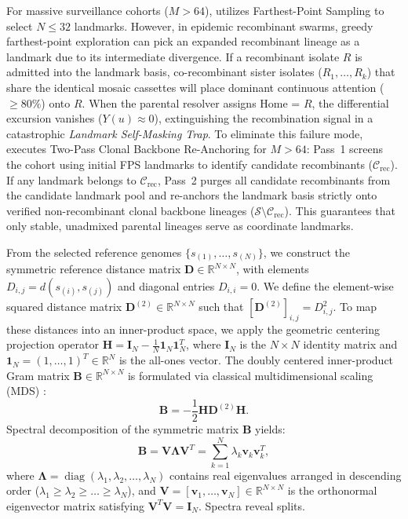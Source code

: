 For massive surveillance cohorts ($M > 64$), \RhizAeon utilizes Farthest-Point Sampling to select $N \le 32$ landmarks.
However, in epidemic recombinant swarms, greedy farthest-point exploration can pick an expanded recombinant lineage as a landmark due to its intermediate divergence.
If a recombinant isolate $R$ is admitted into the landmark basis, co-recombinant sister isolates ($R_1, \dots, R_k$) that share the identical mosaic cassettes will place dominant continuous attention ($\ge 80\%$) onto $R$.
When the parental resolver assigns Home = $R$, the differential excursion vanishes ($Y(u) \approx 0$), extinguishing the recombination signal in a catastrophic \textit{Landmark Self-Masking Trap}.
To eliminate this failure mode, \RhizAeon executes Two-Pass Clonal Backbone Re-Anchoring for $M > 64$:
Pass~1 screens the cohort using initial FPS landmarks to identify candidate recombinants ($\mathcal{C}_{\text{rec}}$).
If any landmark belongs to $\mathcal{C}_{\text{rec}}$, Pass~2 purges all candidate recombinants from the candidate landmark pool and re-anchors the landmark basis strictly onto verified non-recombinant clonal backbone lineages ($\mathcal{S} \setminus \mathcal{C}_{\text{rec}}$).
This guarantees that only stable, unadmixed parental lineages serve as coordinate landmarks.

From the selected reference genomes $\{s_{(1)}, \dots, s_{(N)}\}$, we construct the symmetric reference distance matrix $\mathbf{D} \in \mathbb{R}^{N \times N}$, with elements $D_{i,j} = d(s_{(i)}, s_{(j)})$ and diagonal entries $D_{i,i} = 0$.
We define the element-wise squared distance matrix $\mathbf{D}^{(2)} \in \mathbb{R}^{N \times N}$ such that $[\mathbf{D}^{(2)}]_{i,j} = D_{i,j}^2$.
To map these distances into an inner-product space, we apply the geometric centering projection operator $\mathbf{H} = \mathbf{I}_N - \frac{1}{N} \mathbf{1}_N \mathbf{1}_N^T$, where $\mathbf{I}_N$ is the $N \times N$ identity matrix and $\mathbf{1}_N = (1, \dots, 1)^T \in \mathbb{R}^N$ is the all-ones vector.
The doubly centered inner-product Gram matrix $\mathbf{B} \in \mathbb{R}^{N \times N}$ is formulated via classical multidimensional scaling (MDS) \citep{gower1966some}:
\begin{equation}
\mathbf{B} = -\frac{1}{2} \mathbf{H} \mathbf{D}^{(2)} \mathbf{H}.
\label{eq:methods_gram_matrix}
\end{equation}
Spectral decomposition of the symmetric matrix $\mathbf{B}$ yields:
\begin{equation}
\mathbf{B} = \mathbf{V} \mathbf{\Lambda} \mathbf{V}^T = \sum_{k=1}^N \lambda_k \mathbf{v}_k \mathbf{v}_k^T,
\label{eq:methods_spectral_decomp}
\end{equation}
where $\mathbf{\Lambda} = \operatorname{diag}(\lambda_1, \lambda_2, \dots, \lambda_N)$ contains real eigenvalues arranged in descending order ($\lambda_1 \ge \lambda_2 \ge \dots \ge \lambda_N$), and $\mathbf{V} = [\mathbf{v}_1, \dots, \mathbf{v}_N] \in \mathbb{R}^{N \times N}$ is the orthonormal eigenvector matrix satisfying $\mathbf{V}^T \mathbf{V} = \mathbf{I}_N$.
Spectra reveal splits.

